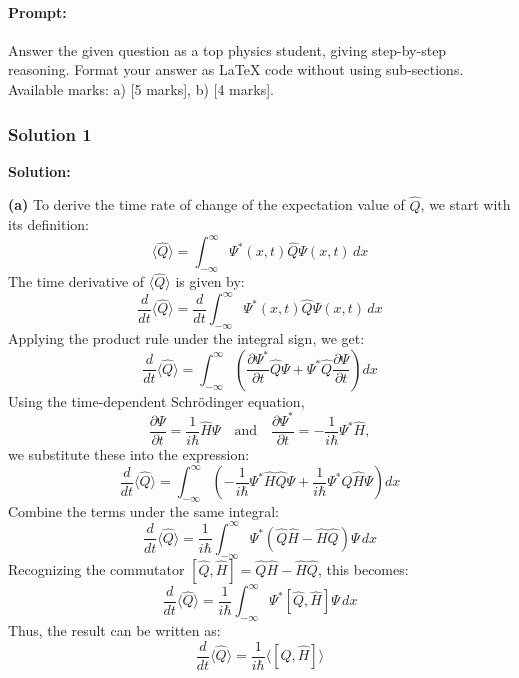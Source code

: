 \documentclass{article}
\begin{document}
\paragraph{Prompt: \\} 
Answer the given question as a top physics student, giving step-by-step reasoning. Format your answer as LaTeX code without using sub-sections. Available marks: a) [5 marks], b) [4 marks].


\subsubsection{Solution 1}
\textbf{Solution:}

\textbf{(a)} To derive the time rate of change of the expectation value of $\hat{Q}$, we start with its definition:
\[
\langle \hat{Q} \rangle = \int_{-\infty}^\infty \Psi^*(x, t) \hat{Q} \Psi(x, t) \, dx
\]
The time derivative of $\langle \hat{Q} \rangle$ is given by:
\[
\frac{d}{dt} \langle \hat{Q} \rangle = \frac{d}{dt} \int_{-\infty}^\infty \Psi^*(x, t) \hat{Q} \Psi(x, t) \, dx
\]
Applying the product rule under the integral sign, we get:
\[
\frac{d}{dt} \langle \hat{Q} \rangle = \int_{-\infty}^\infty \left( \frac{\partial \Psi^*}{\partial t} \hat{Q} \Psi + \Psi^* \hat{Q} \frac{\partial \Psi}{\partial t} \right) dx
\]
Using the time-dependent Schrödinger equation, 
\[
\frac{\partial \Psi}{\partial t} = \frac{1}{i\hbar} \hat{H} \Psi \quad \text{and} \quad \frac{\partial \Psi^*}{\partial t} = -\frac{1}{i\hbar} \Psi^* \hat{H},
\]
we substitute these into the expression:
\[
\frac{d}{dt} \langle \hat{Q} \rangle = \int_{-\infty}^\infty \left( -\frac{1}{i\hbar} \Psi^* \hat{H} \hat{Q} \Psi + \frac{1}{i\hbar} \Psi^* \hat{Q} \hat{H} \Psi \right) dx
\]
Combine the terms under the same integral:
\[
\frac{d}{dt} \langle \hat{Q} \rangle = \frac{1}{i\hbar} \int_{-\infty}^\infty \Psi^* \left( \hat{Q} \hat{H} - \hat{H} \hat{Q} \right) \Psi \, dx
\]
Recognizing the commutator $\left[ \hat{Q}, \hat{H} \right] = \hat{Q} \hat{H} - \hat{H} \hat{Q}$, this becomes:
\[
\frac{d}{dt} \langle \hat{Q} \rangle = \frac{1}{i\hbar} \int_{-\infty}^\infty \Psi^* \left[ \hat{Q}, \hat{H} \right] \Psi \, dx
\]
Thus, the result can be written as:
\[
\frac{d}{dt} \langle \hat{Q} \rangle = \frac{1}{i\hbar} \langle [\hat{Q}, \hat{H}] \rangle
\]
\end{document}
